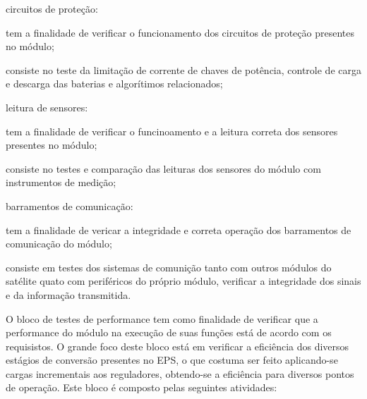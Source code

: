 \begin{alineas}
    \item circuitos de proteção:
    \begin{alineas}
        \item tem a finalidade de verificar o funcionamento dos circuitos de proteção presentes no módulo;
        \item consiste no teste da limitação de corrente de chaves de potência, controle de carga e descarga das baterias e algorítimos relacionados;
    \end{alineas}

    \item leitura de sensores:
    \begin{alineas}
        \item tem a finalidade de verificar o funcinoamento e a leitura correta dos sensores presentes no módulo;
        \item consiste no testes e comparação das leituras dos sensores do módulo com instrumentos de medição;
    \end{alineas}

    \item barramentos de comunicação:
    \begin{alineas}
        \item tem a finalidade de vericar a integridade e correta operação dos barramentos de comunicação do módulo;
        \item consiste em testes dos sistemas de comunição tanto com outros módulos do satélite quato com periféricos do próprio módulo, verificar a integridade dos sinais e da informação transmitida.
    \end{alineas}
\end{alineas}

O bloco de testes de performance tem como finalidade de verificar que a performance do módulo na execução de suas funções está de acordo com os requisistos.
O grande foco deste bloco está em verificar a eficiência dos diversos estágios de conversão presentes no \gls{EPS}, o que costuma ser feito aplicando-se cargas incrementais aos reguladores, obtendo-se a eficiência para diversos pontos de operação.
Este bloco é composto pelas seguintes atividades:

